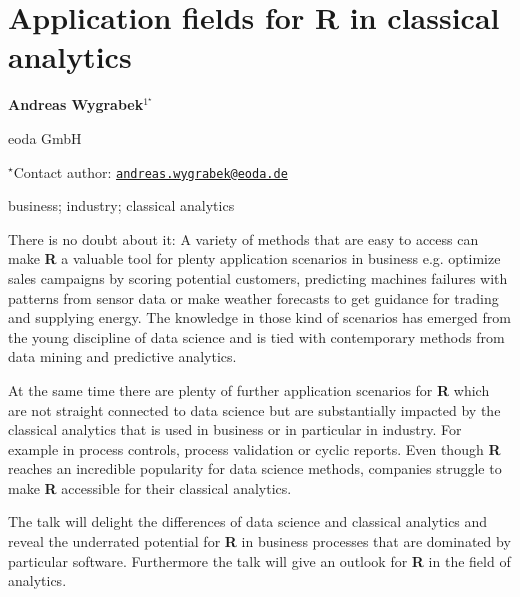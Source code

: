 \documentclass[\main/boa.tex]{subfiles}
\begin{document}
\section{Application fields for R in classical analytics}

\begin{center}
  {\bf {} Andreas Wygrabek$^{1^\star}$}
\end{center}

\vskip 0.3cm

\begin{affiliations}
\begin{enumerate}
\begin{minipage}{0.915\textwidth}
\centering
\item eoda GmbH \\[-2pt]
\end{minipage}
\end{enumerate}
$^\star$Contact author: \href{mailto:andreas.wygrabek@eoda.de}{\nolinkurl{andreas.wygrabek@eoda.de}}\\
\end{affiliations}

\vskip 0.5cm

\begin{minipage}{0.915\textwidth}
\keywords business; industry; classical analytics
\end{minipage}

\vskip 0.8cm

There is no doubt about it: A variety of methods that are easy to access can make \textbf{R} a valuable tool for plenty application scenarios in business e.g. optimize sales campaigns by scoring potential customers, predicting machines failures with patterns from sensor data or make weather forecasts to get guidance for trading and supplying energy. The knowledge in those kind of scenarios has emerged from the young discipline of data science and is tied with contemporary methods from data mining and predictive analytics.

At the same time there are plenty of further application scenarios for \textbf{R} which are not straight connected to data science but are substantially impacted by the classical analytics that is used in business or in particular in industry. For example in process controls, process validation or cyclic reports. Even though \textbf{R} reaches an incredible popularity for data science methods, companies struggle to make \textbf{R} accessible for their classical analytics.

The talk will delight the differences of data science and classical analytics and reveal the underrated potential for \textbf{R} in business processes that are dominated by particular software. Furthermore the talk will give an outlook for \textbf{R} in the field of analytics.  
\end{document}
